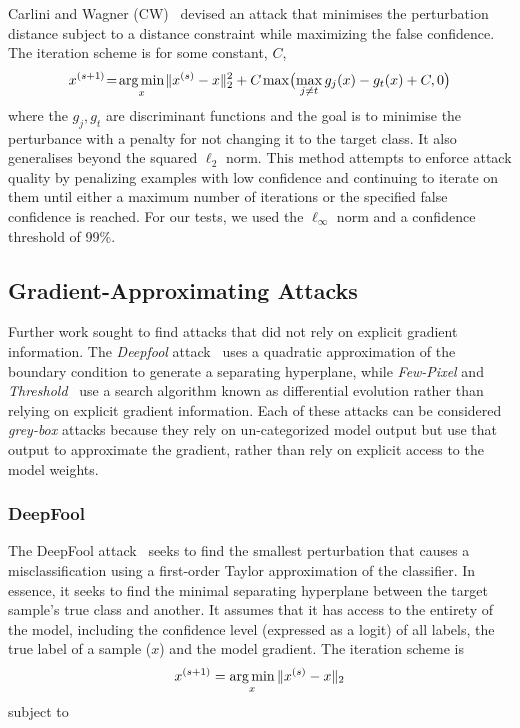 Carlini and Wagner (CW)~\cite{carlini_towards_2017} devised an attack that minimises the perturbation distance subject to a distance constraint while maximizing the false confidence.
The iteration scheme is for some constant, $C$,
$$
    x^{(s+1\hspace{-0.025em})}\hspace{-0.2em}=\hspace{-0.15em}\operatorname*{arg\,min}_x \hspace{-0.1em} \|x^{(s)} - x\|_2^2 + C \hspace{-0.05em} \max\hspace{-0.15em}\big(\hspace{-0.15em}\max_{j\neq t} g_j(x) - g_t(x) + C, 0\big)
$$
where the $g_j, g_t$ are discriminant functions and the goal is to minimise the perturbance with a penalty for not changing it to the target class.
It also generalises beyond the squared $\ell_2$ norm.
This method attempts to enforce attack quality by penalizing examples with low confidence and continuing to iterate on them until either a maximum number of iterations or the specified false confidence is reached.
For our tests, we used the $\ell_{\infty}$ norm and a confidence threshold of 99\%.

\subsection{Gradient-Approximating Attacks}

Further work sought to find attacks that did not rely on explicit gradient information.
The \textit{Deepfool} attack~\cite{deepfool} uses a quadratic approximation of the boundary condition to generate a separating hyperplane, while \textit{Few-Pixel} and \textit{Threshold}~\cite{pixelattack} use a search algorithm known as differential evolution rather than relying on explicit gradient information.
Each of these attacks can be considered \textit{grey-box} attacks because they rely on un-categorized model output but use that output to approximate the gradient, rather than rely on explicit access to the model weights.



\subsubsection{DeepFool}

The DeepFool attack~\cite{deepfool} seeks to find the smallest perturbation that causes a misclassification using a first-order Taylor approximation of the classifier.
In essence, it seeks to find the minimal separating hyperplane between the target sample's true class and another.
It assumes that it has access to the entirety of the model, including the confidence level (expressed as a logit) of all labels, the true label of a sample ($x$) and the model gradient.
The iteration scheme is
$$
    x^{(s+1)} = \operatorname*{arg\,min}_x \|x^{(s)} - x\|_2
$$
subject to

